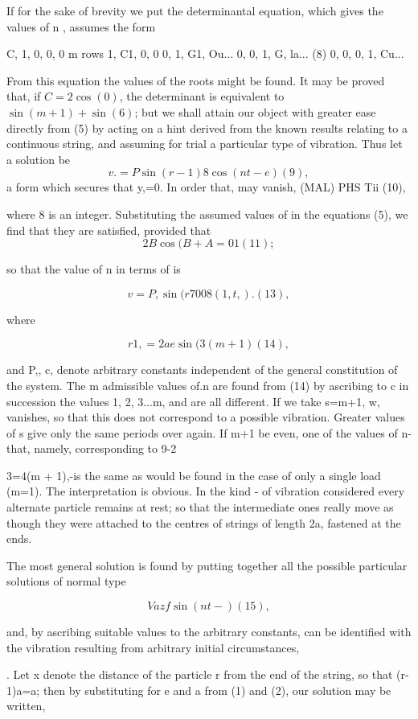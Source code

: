 If for the sake of brevity we put the determinantal equation, which gives the
values of n , assumes the form


C, 1, 0, 0, 0 m rows 1, C1, 0, 0 0, 1, G1, Ou... 0, 0, 1, G, la... (8) 0, 0, 0,
1, Cu...

From this equation the values of the roots might be found. It may be proved
that, if \(C= 2 \cos(0)\), the determinant is equivalent to
\(\sin(m+1) + \sin(6)\); but we shall attain our object with greater ease directly from (5)
by acting on a hint derived from the known results relating to a continuous
string, and assuming for trial a particular type of vibration. Thus let a solution be
\[v.=P \sin(r-1) 8 \cos(nt-e) (9),\]
a form which secures that y,=0. In order that, may vanish, (MAL) PHS Tii (10),

where 8 is an integer. Substituting the assumed values of in the equations (5),
we find that they are satisfied, provided that
\[2B \cos(B + A =0 1  (11);\]

so that the value of n in terms of is

\[v= P, \sin(r 7 008 (1,t,) . (13),\]

where

\[r1,= 2 ae \sin(3 (m+ 1) (14),\]

and P,, c, denote arbitrary constants independent of the general constitution
of the system. The m admissible values of.n are found from (14) by ascribing to
c in succession the values 1, 2, 3...m, and are all different. If we take
s=m+1, w, vanishes, so that this does not correspond to a possible vibration.
Greater values of s give only the same periods over again. If m+1 be even, one
of the values of n-that, namely, corresponding to 9-2

3=4(m + 1),-is the same as would be found in the case of only a single load
(m=1). The interpretation is obvious. In the kind - of vibration considered
every alternate particle remains at rest; so that the intermediate ones really
move as though they were attached to the centres of strings of length 2a,
fastened at the ends.

The most general solution is found by putting together all the possible
particular solutions of normal type

\[Vaz f \sin(nt -) (15),\]

and, by ascribing suitable values to the arbitrary constants, can be identified
with the vibration resulting from arbitrary initial circumstances,

. Let x denote the distance of the particle r from the end of the string, so
that (r-1)a=a; then by substituting for e and a from (1) and (2), our solution
may be written,


